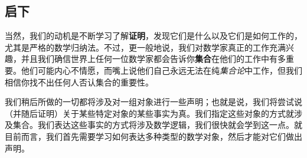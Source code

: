 \subsection{启下}

当然，我们的动机是不断学习了解\textbf{证明}，发现它们是什么以及它们是如何工作的，尤其是严格的数学归纳法。不过，更一般地说，我们对数学家真正的工作充满兴趣，并且我们确信世界上任何一位数学家都会告诉你\textbf{集合}在他们的工作中有多重要。他们可能内心不情愿，而嘴上说他们自己永远无法在纯\emph{集合论}中工作，但我们相信你找不出任何人否认集合的重要性。

我们稍后所做的一切都将涉及对一组对象进行一些声明；也就是说，我们将尝试说（并随后证明）关于某些特定对象的某些事实为真。我们指定这些对象的方式就涉及集合。我们表达这些事实的方式将涉及数学逻辑，我们很快就会学到这一点。就目前而言，我们首先需要学习如何表达多种类型的数学对象，然后才能对它们做出声明。
